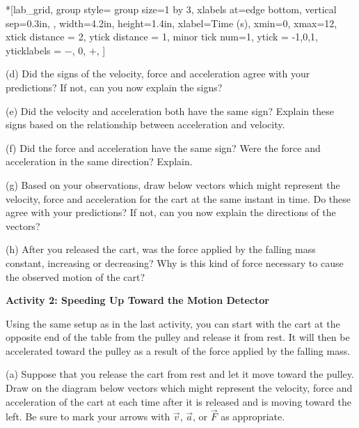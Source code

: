 \begin{lab_groupplot}*{}[lab_grid,
	group style={
		group size=1 by 3,
		xlabels at=edge bottom,
		vertical sep=0.3in,
		},
	width=4.2in,  height=1.4in,
	xlabel=Time (s),
	xmin=0, xmax=12,
	xtick distance = 2, 
	ytick distance = 1, 
	minor tick num=1,
	ytick = {-1,0,1},
	yticklabels = {$-$, 0, $+$},
	]
\nextgroupplot[
	ymin=-1,ymax=1, 
	ylabel={Velocity (m/s)},
	]
\nextgroupplot[
	ymin=-1,ymax=1, 
	ylabel={Acceleration (m/s$^2$)},
	]
\nextgroupplot[
	ymin=-1,ymax=1, 
	ylabel={Force (N)},
	]
\end{lab_groupplot}

(d) Did the signs of the velocity, force and acceleration agree with your predictions?
If not, can you now explain the signs?
\answerspace{25mm}

(e) Did the velocity and acceleration both have the same sign? Explain these
signs based on the relationship between acceleration and velocity.
\answerspace{25mm}
\pagebreak[3]

(f) Did the force and acceleration have the same sign? Were the force and acceleration
in the same direction? Explain.
\answerspace{25mm}

(g) Based on your observations, draw below vectors which might represent the
velocity, force and acceleration for the cart at the same instant in time. Do
these agree with your predictions? If not, can you now explain the directions
of the vectors?
\answerspace{25mm}

(h) After you released the cart, was the force applied by the falling mass constant,
increasing or decreasing?  Why is this kind of force necessary to cause
the observed motion of the cart?
\answerspace{25mm}

\textbf{Activity 2: Speeding Up Toward the Motion Detector }

Using the same setup as in the last activity, you can start with the cart at
the opposite end of the table from the pulley and release it from rest.
It will then be accelerated toward the pulley as a result of the force
applied by the falling mass.

(a) Suppose that you release the cart from rest and let it move toward the pulley. Draw on the diagram below vectors which might represent the velocity,
force and acceleration of the cart at each time after it is released and is
moving toward the left. Be sure to mark your arrows with $\vec{v}$, $\vec{a}$,
or $\vec{F}$ as appropriate.

